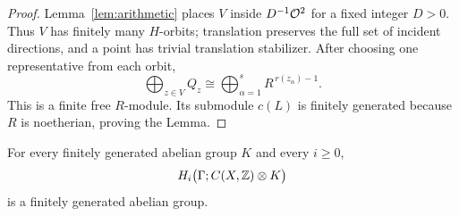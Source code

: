 \begin{proof}
Lemma~\ref{lem:arithmetic} places $V$ inside
$D^{-1}\mathcal O^2$ for a fixed integer $D>0$.  Thus $V$ has finitely
many $H$-orbits; translation preserves the full set of incident
directions, and a point has trivial translation stabilizer.
After choosing one representative from each orbit,
\[
 \bigoplus_{z\in V}Q_z
       \cong\bigoplus_{\alpha=1}^s
                    R^{\,r(z_\alpha)-1}.
\]
This is a finite free $R$-module.  Its submodule $c(L)$ is
finitely generated because $R$ is noetherian, proving the Lemma.
\end{proof}

\begin{lemma}\label{lem:hom-coefficient-finiteness}
For every finitely generated abelian group $K$ and every $i\geq0$,
\[
 H_i\bigl(\Gamma;C(X,\mathbb Z)\otimes K\bigr)
\]
is a finitely generated abelian group.
\end{lemma}


